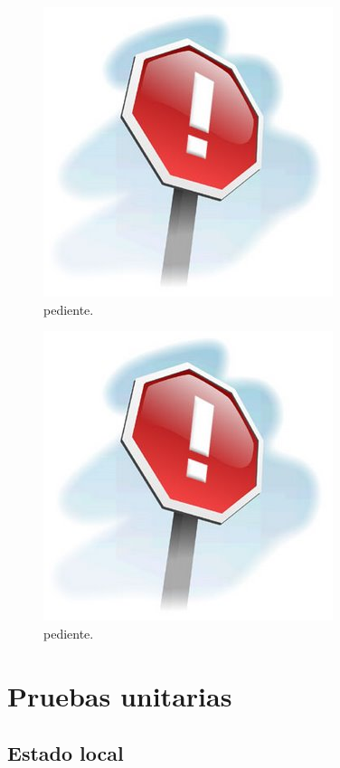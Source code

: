\begin{figure}[ht]
	\centering
	\includegraphics[scale=.25]{./Figures/Capitulo4/pendiente.jpg}
	\caption{pediente.}
	\label{fig:disp_prim}
\end{figure}

\begin{figure}[ht]
	\centering
	\includegraphics[scale=.25]{./Figures/Capitulo4/pendiente.jpg}
	\caption{pediente.}
	\label{fig:disp_sec}
\end{figure}


\section{Pruebas unitarias}

\subsection{Estado local}

